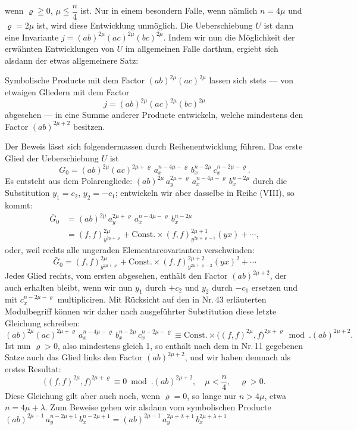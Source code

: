 \documentclass[11pt]{article}
\providecommand{\weberpage}[1]{}
\providecommand{\weq}[2]{\begin{equation}\tag{#1}#2\end{equation}}
\begin{document}
\weberpage{106}
wenn $\varrho \geqq 0$, $\mu \leqq \dfrac{n}{4}$ ist. Nur in einem besondern Falle, wenn
nämlich $n = 4\mu$ und $\varrho = 2\mu$ ist, wird diese Entwicklung unmöglich. Die
Ueberschiebung $U$ ist dann eine Invariante $j = (ab)^{2\mu}(ac)^{2\mu}(bc)^{2\mu}$.
Indem wir nun die Möglichkeit der erwähnten Entwicklungen von $U$
im allgemeinen Falle darthun, ergiebt sich alsdann der etwas allgemeinere
Satz:

\glqq Symbolische Producte mit dem Factor $(ab)^{2\mu}(ac)^{2\mu}$ lassen
sich stets — von etwaigen Gliedern mit dem Factor
\[
j = (ab)^{2\mu}(ac)^{2\mu}(bc)^{2\mu}
\]
abgesehen — in eine Summe anderer Producte entwickeln,
welche mindestens den Factor $(ab)^{2\mu+2}$ besitzen.\grqq{}

Der Beweis lässt sich folgendermassen durch Reihenentwicklung
führen. Das erste Glied der Ueberschiebung $U$ ist
\[
G_0 = (ab)^{2\mu}(ac)^{2\mu+\varrho}\,a_x^{n-4\mu-\varrho}\,b_x^{n-2\mu}\,c_x^{n-2\mu-\varrho}.
\]
Es entsteht aus dem Polarengliede: $(ab)^{2\mu}\,a_y^{2\mu+\varrho}\,a_x^{n-4\mu-\varrho}\,b_x^{n-2\mu}$
durch die Substitution $y_1 = c_2$, $y_2 = -c_1$; entwickeln wir aber
dasselbe in Reihe (VIII), so kommt:
\[
\begin{aligned}
\bar G_0 &= (ab)^{2\mu}\,a_y^{2\mu+\varrho}\,a_x^{n-4\mu-\varrho}\,b_x^{n-2\mu} \\
&= (f,f)^{2\mu}_{y^{2\mu+\varrho}} + \text{Const.}\times (f,f)^{2\mu+1}_{y^{2\mu+\varrho-1}}(yx) + \cdots,
\end{aligned}
\]
oder, weil rechts alle ungeraden Elementarcovarianten verschwinden:
\[
\bar G_0 = (f,f)^{2\mu}_{y^{2\mu+\varrho}} + \text{Const.}\times (f,f)^{2\mu+2}_{y^{2\mu+\varrho-2}}(yx)^2 + \cdots
\]
Jedes Glied rechts, vom ersten abgesehen, enthält den Factor
$(ab)^{2\mu+2}$, der auch erhalten bleibt, wenn wir nun $y_1$ durch $+c_2$ und
$y_2$ durch $-c_1$ ersetzen und mit $c_x^{n-2\mu-\varrho}$ multipliciren. Mit Rücksicht
auf den in Nr.\,43 erläuterten Modulbegriff können wir daher nach
ausgeführter Substitution diese letzte Gleichung schreiben:
\[
(ab)^{2\mu}(ac)^{2\mu+\varrho}\,a_x^{n-4\mu-\varrho}\,b_x^{n-2\mu}\,c_x^{n-2\mu-\varrho}
\equiv \text{Const.}\times \big((f,f)^{2\mu}, f\big)^{2\mu+\varrho} \bmod. (ab)^{2\mu+2}.
\]
Ist nun $\varrho > 0$, also mindestens gleich 1, so enthält nach dem in
Nr.\,11 gegebenen Satze auch das Glied links den Factor $(ab)^{2\mu+2}$, und
wir haben demnach als erstes Resultat:
\weq{I}{\big((f,f)^{2\mu}, f\big)^{2\mu+\varrho} \equiv 0 \bmod. (ab)^{2\mu+2}, \quad \mu < \dfrac{n}{4}, \quad \varrho > 0.}
Diese Gleichung gilt aber auch noch, wenn $\varrho = 0$, so lange nur
$n > 4\mu$, etwa $n = 4\mu + \lambda$. Zum Beweise gehen wir alsdann vom
symbolischen Producte $(ab)^{2\mu-1}\,a_y^{n-2\mu+1}\,b_x^{n-2\mu+1} = (ab)^{2\mu-1}\,a_y^{2\mu+\lambda+1}\,b_x^{2\mu+\lambda+1}$
\end{document}
